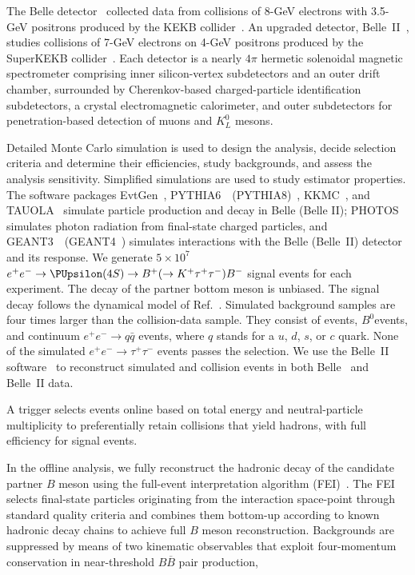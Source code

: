 The Belle detector~\cite{Abashian2002117} collected data from collisions of 8-GeV electrons with 3.5-GeV positrons produced by the KEKB collider~\cite{Kurokawa:2001nw}. An upgraded detector, Belle~II~\cite{Abe:2010gxa}, studies collisions of 7-GeV electrons on 4-GeV positrons produced by the SuperKEKB collider~\cite{Akai:2018mbz}. Each detector is a nearly $4\pi$ hermetic solenoidal magnetic spectrometer comprising inner silicon-vertex subdetectors and an outer drift chamber, surrounded by Cherenkov-based charged-particle identification subdetectors, a crystal electromagnetic calorimeter, and outer subdetectors for penetration-based detection of muons and $K^0_L$ mesons.

Detailed Monte Carlo simulation is used to design the analysis, decide selection criteria and determine their efficiencies, study backgrounds, and assess the analysis sensitivity. Simplified simulations are used to study estimator properties. The software packages {\sc EvtGen}~\cite{Lange:2001uf}, {\sc PYTHIA6}~\cite{Sjostrand:2006za}~({\sc PYTHIA8})~\cite{Sjostrand:2014zea}, {\sc KKMC}~\cite{Jadach:1999vf}, and {\sc TAUOLA}~\cite{Jadach:1990mz} simulate particle production and decay in Belle (Belle II); {\sc PHOTOS}~\cite{Barberio:1990ms} simulates photon radiation from final-state charged particles, and {\sc GEANT3}~\cite{Brun:1987ma}~({\sc GEANT4}~\cite{Agostinelli:2002hh}) simulates interactions with the Belle (Belle~II) detector and its response. We generate $5\times 10^7$ $e^+e^- \to \FourS \to B^+(\to K^+\tau^+\tau^-)B^-$ signal events for each experiment. The decay of the partner bottom meson is unbiased. The signal decay follows the dynamical model of Ref.~\cite{Ali:2000btosll}.
Simulated background samples are four times larger than the collision-data sample. They consist of \BpBm events, $B^0$\Bzb events, and continuum $e^{+} e^{-} \rightarrow q \bar{q}$ events, where $q$ stands for a $u$, $d$, $s$, or $c$ quark. None of the simulated $e^+e^- \to \tau^+\tau^-$ events passes the selection. We use the Belle~II software~\cite{Kuhr:2018lps, basf2-zenodo} to reconstruct simulated and collision events in both Belle~\cite{b2bii} and Belle~II data.

A trigger selects events online based on total energy and neutral-particle multiplicity to preferentially retain collisions that yield hadrons, with full efficiency for signal events.

In the offline analysis,  we fully reconstruct the hadronic decay of the candidate partner $B$ meson using the full-event interpretation algorithm (FEI)~\cite{Keck:2018lcd}. The FEI selects final-state particles originating from the interaction space-point through standard quality criteria and combines them bottom-up according to known hadronic decay chains to achieve full $B$ meson reconstruction. Backgrounds are suppressed by means of two kinematic observables that exploit four-momentum conservation in near-threshold $B\overline{B}$ pair production,

